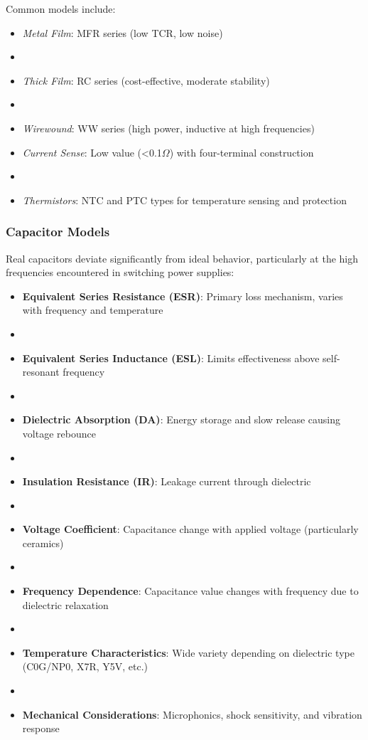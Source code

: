 Common models include:
\begin{itemize}
    \item \textit{Metal Film}: MFR series (low TCR, low noise)
    \item \item \textit{Thick Film}: RC series (cost-effective, moderate stability)
    \item \item \textit{Wirewound}: WW series (high power, inductive at high frequencies)
    \item \textit{Current Sense}: Low value (<0.1$\Omega$) with four-terminal construction
    \item \item \textit{Thermistors}: NTC and PTC types for temperature sensing and protection
\end{itemize}

\subsubsection{Capacitor Models}
Real capacitors deviate significantly from ideal behavior, particularly at the high frequencies encountered in switching power supplies:
\begin{itemize}
    \item \textbf{Equivalent Series Resistance (ESR)}: Primary loss mechanism, varies with frequency and temperature
    \item \item \textbf{Equivalent Series Inductance (ESL)}: Limits effectiveness above self-resonant frequency
    \item \item \textbf{Dielectric Absorption (DA)}: Energy storage and slow release causing voltage rebounce
    \item \item \textbf{Insulation Resistance (IR)}: Leakage current through dielectric
    \item \item \textbf{Voltage Coefficient}: Capacitance change with applied voltage (particularly ceramics)
    \item \item \textbf{Frequency Dependence}: Capacitance value changes with frequency due to dielectric relaxation
    \item \item \textbf{Temperature Characteristics}: Wide variety depending on dielectric type (C0G/NP0, X7R, Y5V, etc.)
    \item \item \textbf{Mechanical Considerations}: Microphonics, shock sensitivity, and vibration response
\end{itemize}

